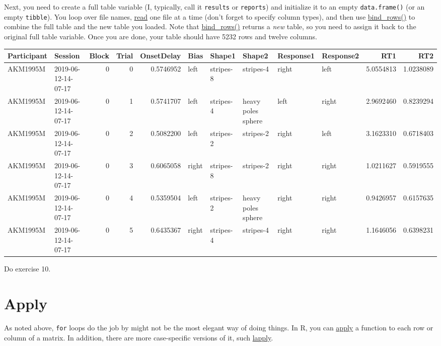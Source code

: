 \documentclass[
]{book}
\begin{document}
Next, you need to create a full table variable (I, typically, call it \texttt{results} or \texttt{reports}) and initialize it to an empty \texttt{data.frame()} (or an empty \texttt{tibble}). You loop over file names, \protect\hyperlink{readr}{read} one file at a time (don't forget to specify column types), and then use \href{https://dplyr.tidyverse.org/reference/bind.html}{bind\_rows()} to combine the full table and the new table you loaded. Note that \href{https://dplyr.tidyverse.org/reference/bind.html}{bind\_rows()} returns a \emph{new} table, so you need to assign it back to the original full table variable. Once you are done, your table should have 5232 rows and twelve columns.

\begin{tabular}{l|l|r|r|r|l|l|l|l|l|r|r}
\hline
Participant & Session & Block & Trial & OnsetDelay & Bias & Shape1 & Shape2 & Response1 & Response2 & RT1 & RT2\\
\hline
AKM1995M & 2019-06-12-14-07-17 & 0 & 0 & 0.5746952 & left & stripes-8 & stripes-4 & right & left & 5.0554813 & 1.0238089\\
\hline
AKM1995M & 2019-06-12-14-07-17 & 0 & 1 & 0.5741707 & left & stripes-4 & heavy poles sphere & left & right & 2.9692460 & 0.8239294\\
\hline
AKM1995M & 2019-06-12-14-07-17 & 0 & 2 & 0.5082200 & left & stripes-2 & stripes-2 & right & left & 3.1623310 & 0.6718403\\
\hline
AKM1995M & 2019-06-12-14-07-17 & 0 & 3 & 0.6065058 & right & stripes-8 & stripes-2 & right & right & 1.0211627 & 0.5919555\\
\hline
AKM1995M & 2019-06-12-14-07-17 & 0 & 4 & 0.5359504 & left & stripes-2 & heavy poles sphere & right & right & 0.9426957 & 0.6157635\\
\hline
AKM1995M & 2019-06-12-14-07-17 & 0 & 5 & 0.6435367 & right & stripes-4 & stripes-4 & right & right & 1.1646056 & 0.6398231\\
\hline
\end{tabular}

Do exercise 10.

\hypertarget{apply}{%
\section{Apply}\label{apply}}

As noted above, \texttt{for} loops do the job by might not be the most elegant way of doing things. In R, you can \href{https://stat.ethz.ch/R-manual/R-devel/library/base/html/apply.html}{apply} a function to each row or column of a matrix. In addition, there are more case-specific versions of it, such \href{https://stat.ethz.ch/R-manual/R-devel/library/base/html/lapply.html}{lapply}.
\end{document}
